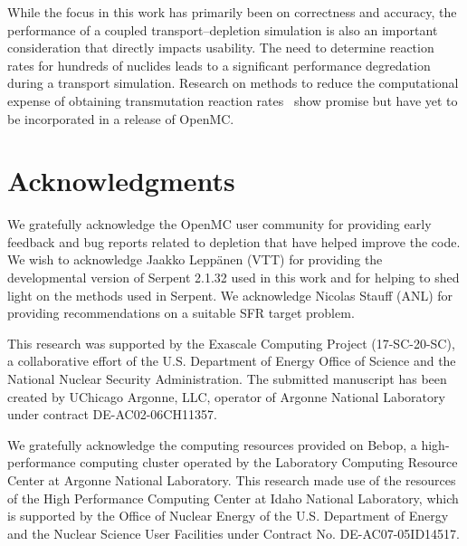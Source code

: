 \documentclass[3p,authoryear]{elsarticle}
\begin{document}
While the focus in this work has primarily been on correctness and accuracy, the
performance of a coupled transport--depletion simulation is also an important
consideration that directly impacts usability. The need to determine reaction
rates for hundreds of nuclides leads to a significant performance degredation
during a transport simulation. Research on methods to reduce the computational
expense of obtaining transmutation reaction rates~\citep{salcedoperez2019mc}
show promise but have yet to be incorporated in a release of OpenMC.

\section*{Acknowledgments}

We gratefully acknowledge the OpenMC user community for providing early feedback
and bug reports related to depletion that have helped improve the code. We wish
to acknowledge Jaakko Lepp{\"{a}}nen (VTT) for providing the developmental
version of Serpent 2.1.32 used in this work and for helping to shed light on the
methods used in Serpent. We acknowledge Nicolas Stauff (ANL) for providing
recommendations on a suitable SFR target problem.

This research was supported by the Exascale Computing Project (17-SC-20-SC), a
collaborative effort of the U.S. Department of Energy Office of Science and the
National Nuclear Security Administration. The submitted manuscript has been
created by UChicago Argonne, LLC, operator of Argonne National Laboratory under
contract DE-AC02-06CH11357.

We gratefully acknowledge the computing resources provided on Bebop, a
high-performance computing cluster operated by the Laboratory Computing Resource
Center at Argonne National Laboratory. This research made use of the resources
of the High Performance Computing Center at Idaho National Laboratory, which is
supported by the Office of Nuclear Energy of the U.S. Department of Energy and
the Nuclear Science User Facilities under Contract No. DE-AC07-05ID14517.




\end{document}
